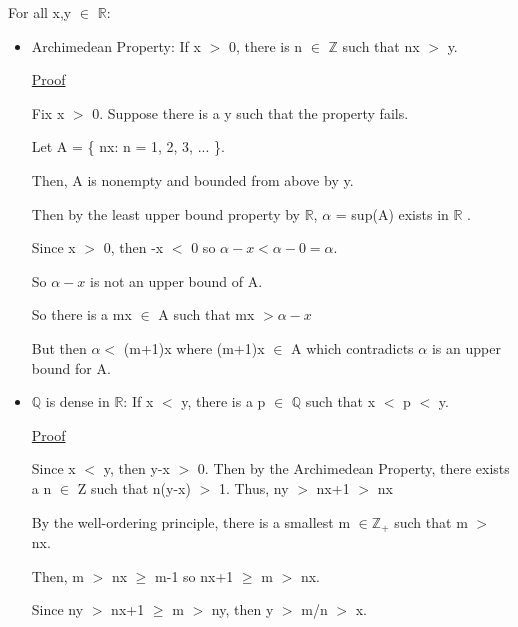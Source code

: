 For all x,y $\in$ $ \mathbb{R} $:
\begin{itemize}[leftmargin=1cm]
	\item {\color{lblue} Archimedean Property}:
		If x $>$ 0, there is n $\in$ $ \mathbb{Z} $ such that nx $>$ y.
	
		{ \color{magenta} \underline{Proof} }

		Fix x $>$ 0. Suppose there is a y such that the property fails.

		Let A = \{ nx: n = 1, 2, 3, ... \}.

		Then, A is nonempty and bounded from above by y.

		Then by the least upper bound property by $ \mathbb{R} $, $\alpha$ = sup(A) exists in $ \mathbb{R} $ .

		Since x $>$ 0, then -x $<$ 0 so $\alpha - x < \alpha-0 = \alpha$.

		So $\alpha-x$ is not an upper bound of A.

		So there is a mx $\in$ A such that mx $> \alpha-x$

		But then $\alpha <$ (m+1)x where (m+1)x $\in$ A which contradicts $\alpha$ is an upper bound for A.

	\item {\color{lblue} $ \mathbb{Q} $  is dense in $ \mathbb{R} $}:
		If x $<$ y, there is a p $\in$ $ \mathbb{Q} $ such that x $<$ p $<$ y.

		{ \color{magenta} \underline{Proof} }

		Since x $<$ y, then y-x $>$ 0. Then by the Archimedean Property, there exists a n $\in$ Z
		such that n(y-x) $>$ 1. Thus, ny $>$ nx+1 $>$ nx

		By the well-ordering principle, there is a smallest m $\in \mathbb{Z_+} $ such that m $>$ nx.

		Then, m $>$ nx $\geq$ m-1 so nx+1 $\geq$ m $>$ nx.

		Since ny $>$ nx+1 $\geq$ m $>$ ny, then y $>$ m/n $>$ x.

\end{itemize}
